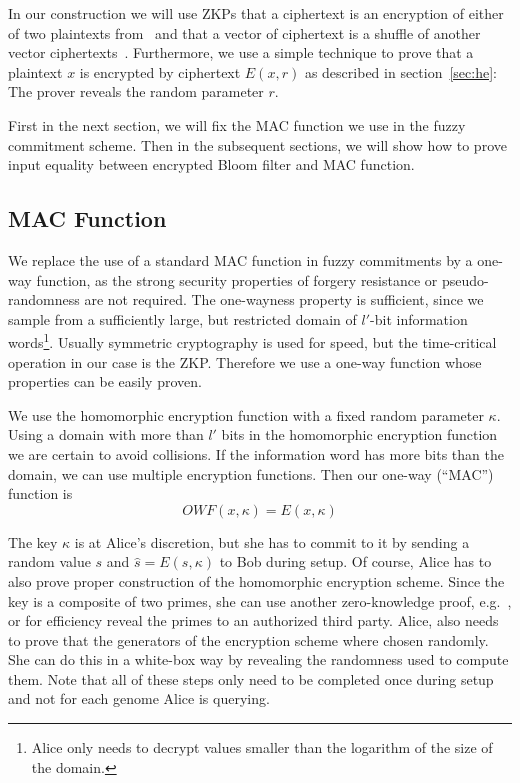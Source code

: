 \documentclass{llncs}
\begin{document}
In our construction we will use ZKPs that a ciphertext is an encryption of either of two plaintexts from~\cite{DamJur01} and that a vector of ciphertext is a shuffle of another vector ciphertexts~\cite{Gro10}.
Furthermore, we use a simple technique to prove that a plaintext $x$ is encrypted by ciphertext $E(x, r)$ as described in section~\ref{sec:he}:
The prover reveals the random parameter $r$.

First in the next section, we will fix the MAC function we use in the fuzzy commitment scheme.
Then in the subsequent sections, we will show how to prove input equality between encrypted Bloom filter and MAC function.

\subsection{MAC Function}
\label{sec:mac}

We replace the use of a standard MAC function in fuzzy commitments by a one-way function, as the strong security properties of forgery resistance or pseudo-randomness are not required. The one-wayness property is sufficient, since we sample from a sufficiently large, but restricted domain of $l'$-bit information words\footnote{Alice only needs to decrypt values smaller than the logarithm of the size of the domain.}.
Usually symmetric cryptography is used for speed, but the time-critical operation in our case is the ZKP.
Therefore we use a one-way function whose properties can be easily proven.

We use the homomorphic encryption function with a fixed random parameter $\kappa$.
Using a domain with more than $l'$ bits in the homomorphic encryption function we are certain to avoid collisions.
If the information word has more bits than the domain, we can use multiple encryption functions.
Then our one-way (``MAC'') function is
$$
OWF(x, \kappa) = E(x, \kappa)
$$

The key $\kappa$ is at Alice's discretion, but she has to commit to it by sending a random value $s$ and $\hat{s} = E(s, \kappa)$ to Bob during setup.
Of course, Alice has to also prove proper construction of the homomorphic encryption scheme.
Since the key is a composite of two primes, she can use another zero-knowledge proof, e.g.~\cite{CamMic99}, or for efficiency reveal the primes to an authorized third party.
Alice, also needs to prove that the generators of the encryption scheme where chosen randomly.
She can do this in a white-box way by revealing the randomness used to compute them.
Note that all of these steps only need to be completed once during setup and not for each genome Alice is querying.
\end{document}
